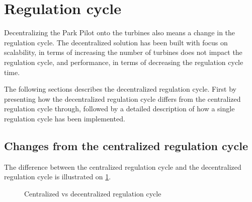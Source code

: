 \section{Regulation cycle}

Decentralizing the Park Pilot onto the turbines also means a change in the regulation cycle. The decentralized solution has been built with focus on scalability, in terms of increasing the number of turbines does not impact the regulation cycle, and performance, in terms of decreasing the regulation cycle time.

The following sections describes the decentralized regulation cycle. First by presenting how the decentralized regulation cycle differs from the centralized regulation cycle through, followed by a detailed description of how a single regulation cycle has been implemented. 


\subsection{Changes from the centralized regulation cycle}

The difference between the centralized regulation cycle and the decentralized regulation cycle is illustrated on \cref{fig:cycleCentralVSDecentral}. 

\begin{figure}

	{}
	\newline
	
	\newline
	
	{}
	\newline
	
	\caption{Centralized vs decentralized regulation cycle}
	\label{fig:cycleCentralVSDecentral}
\end{figure}

